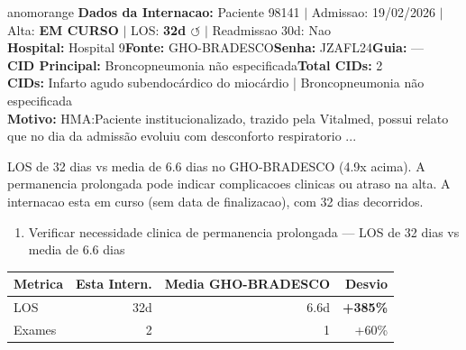 \documentclass[a4paper,10pt]{article}
\begin{document}
\begin{anomalycard}[Internacao 118284 | GHO-BRADESCO | ALTO (z=3.20)]{anomorange}
\textbf{Dados da Internacao:} Paciente 98141 $\mid$ Admissao: 19/02/2026 $\mid$ Alta: \textcolor{anomorange}{\textbf{EM CURSO}} $\mid$ LOS: \textbf{32d \textcolor{anomorange}{$\circlearrowleft$}} $\mid$ Readmissao 30d: Nao\\
\textbf{Hospital:} Hospital 9\quad\textbf{Fonte:} GHO-BRADESCO\quad\textbf{Senha:} JZAFL24\quad\textbf{Guia:} ---\\
\textbf{CID Principal:} {\small Broncopneumonia não especificada}\quad\textbf{Total CIDs:} 2\\

\textbf{CIDs:} {\scriptsize Infarto agudo subendocárdico do miocárdio | Broncopneumonia não especificada}\\

\textbf{Motivo:} {\scriptsize HMA:Paciente institucionalizado, trazido pela Vitalmed, possui relato que no dia da admissão evoluiu com desconforto respiratorio ...}\\

\vspace{2pt}\begin{tcolorbox}[colback=severityred!20,colframe=anomorange,title={\textbf{Interpretacao de Negocio}},fonttitle=\bfseries\small,left=4pt,right=4pt,top=3pt,bottom=3pt]
{\small LOS de 32 dias vs media de 6.6 dias no GHO-BRADESCO (4.9x acima). A permanencia prolongada pode indicar complicacoes clinicas ou atraso na alta. A internacao esta em curso (sem data de finalizacao), com 32 dias decorridos.}
\end{tcolorbox}
\begin{tcolorbox}[colback=severityyellow!30,colframe=anomorange,title={\textbf{Recomendacoes Especificas}},fonttitle=\bfseries\small,left=4pt,right=4pt,top=3pt,bottom=3pt]
\begin{enumerate}[nosep,leftmargin=16pt]
\item {\small Verificar necessidade clinica de permanencia prolongada --- LOS de 32 dias vs media de 6.6 dias}
\end{enumerate}
\end{tcolorbox}
\begin{center}\begin{tabular}{l r r r}\toprule\textbf{Metrica} & \textbf{Esta Intern.} & \textbf{Media GHO-BRADESCO} & \textbf{Desvio} \\\midrule
LOS & 32d & 6.6d & \textcolor{anomred}{\textbf{+385\%}} \\
Exames & 2 & 1 & \textcolor{anomorange}{+60\%} \\
\bottomrule\end{tabular}\end{center}


\end{anomalycard}
\end{document}
